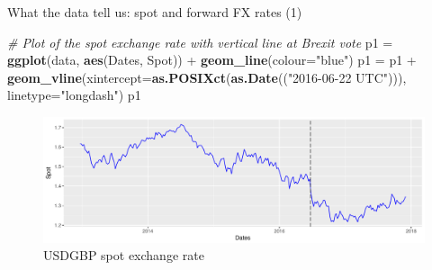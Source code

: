 \documentclass[ignorenonframetext,aspectratio=169]{beamer}
\newenvironment{Shaded}{}{}
\newcommand{\KeywordTok}[1]{\textcolor[rgb]{0.00,0.44,0.13}{\textbf{#1}}}
\newcommand{\DataTypeTok}[1]{\textcolor[rgb]{0.56,0.13,0.00}{#1}}
\newcommand{\StringTok}[1]{\textcolor[rgb]{0.25,0.44,0.63}{#1}}
\newcommand{\CommentTok}[1]{\textcolor[rgb]{0.38,0.63,0.69}{\textit{#1}}}
\newcommand{\OperatorTok}[1]{\textcolor[rgb]{0.40,0.40,0.40}{#1}}
\newcommand{\NormalTok}[1]{#1}
\begin{document}
\begin{frame}[fragile]{What the data tell us: spot and forward FX rates
(1)}

\begin{Shaded}
\begin{Highlighting}[]
\CommentTok{# Plot of the spot exchange rate with vertical line at Brexit vote}
\NormalTok{p1 =}\StringTok{ }\KeywordTok{ggplot}\NormalTok{(data, }\KeywordTok{aes}\NormalTok{(Dates, Spot)) }\OperatorTok{+}\StringTok{ }\KeywordTok{geom_line}\NormalTok{(}\DataTypeTok{colour=}\StringTok{"blue"}\NormalTok{) }
\NormalTok{p1 =}\StringTok{ }\NormalTok{p1 }\OperatorTok{+}\StringTok{ }\KeywordTok{geom_vline}\NormalTok{(}\DataTypeTok{xintercept=}\KeywordTok{as.POSIXct}\NormalTok{(}\KeywordTok{as.Date}\NormalTok{((}\StringTok{"2016-06-22 UTC"}\NormalTok{))),}
                     \DataTypeTok{linetype=}\StringTok{"longdash"}\NormalTok{)}
\NormalTok{p1}
\end{Highlighting}
\end{Shaded}

\begin{figure}
\includegraphics[width=1\linewidth]{2018_02_07_IMF_FXCourse_files/figure-beamer/unnamed-chunk-8-1} \caption{USDGBP spot exchange rate}\label{fig:unnamed-chunk-8}
\end{figure}

\end{frame}
\end{document}
